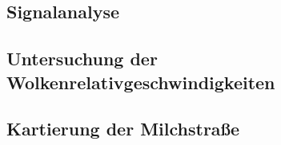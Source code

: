 \documentclass[../main.tex]{subfiles}
\begin{document}
    

    \subsection{Signalanalyse}
        

    \subsection{Untersuchung der Wolkenrelativgeschwindigkeiten}
        

    \subsection{Kartierung der Milchstraße}
        


    
\end{document}
